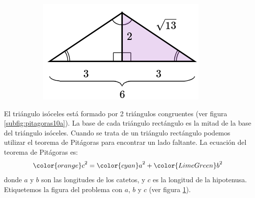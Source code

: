 \begin{solutionbox}{10.5cm}
\begin{figure}[H]
\begin{subfigure}{0.22\linewidth}
            \caption{}
            \label{subfig:pitagoras10b}
        \end{subfigure}
        \begin{subfigure}{0.22\linewidth}
            \includegraphics[width=0.9\linewidth]{../images/pitagoras10c.png}
            \caption{}
            \label{subfig:pitagoras10c}
        \end{subfigure}
        \caption{}
        \label{fig:pitagoras10}
    \end{figure}

    \vspace{-0.5cm}
    El triángulo isóceles está formado por 2 triángulos congruentes (ver figura \ref{subfig:pitagoras10a}).
    La base de cada triángulo rectángulo es la mitad de la base del triángulo isóceles.
    Cuando se trata de un triángulo rectángulo podemos utilizar el teorema de Pitágoras para encontrar un lado faltante.
    La ecuación del teorema de Pitágoras es:
    \[{\color{orange}c}^2={\color{cyan}a}^2+{\color{LimeGreen}b}^2\]
    donde $a$ y $b$ son las longitudes de los catetos, y $c$ es la longitud de la hipotenusa.
    Etiquetemos la figura del problema con $a$, $b$ y $c$ (ver figura \ref{subfig:pitagoras10b}).


\end{solutionbox}

